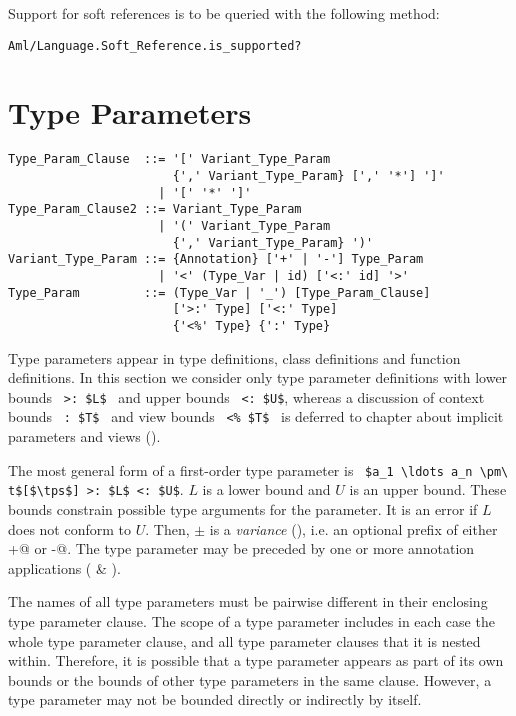 Support for soft references is to be queried with the following method:
\begin{lstlisting}
Aml/Language.Soft_Reference.is_supported?
\end{lstlisting}





\section{Type Parameters}

\grammar\begin{lstlisting}
Type_Param_Clause  ::= '[' Variant_Type_Param 
                       {',' Variant_Type_Param} [',' '*'] ']'
                     | '[' '*' ']'
Type_Param_Clause2 ::= Variant_Type_Param
                     | '(' Variant_Type_Param 
                       {',' Variant_Type_Param} ')'
Variant_Type_Param ::= {Annotation} ['+' | '-'] Type_Param
                     | '<' (Type_Var | id) ['<:' id] '>'
Type_Param         ::= (Type_Var | '_') [Type_Param_Clause]
                       ['>:' Type] ['<:' Type]
                       {'<%' Type} {':' Type}
\end{lstlisting}

Type parameters appear in type definitions, class definitions and function definitions. In this section we consider only type parameter definitions with lower bounds ~\lstinline!>: $L$!~ and upper bounds ~\lstinline!<: $U$!, whereas a discussion of context bounds ~\lstinline!: $T$!~ and view bounds ~\lstinline!<% $T$!~ is deferred to chapter about implicit parameters and views ().

The most general form of a first-order type parameter is ~\lstinline!$a_1 \ldots a_n \pm\ t$[$\tps$] >: $L$ <: $U$!. $L$ is a lower bound and $U$ is an upper bound. These bounds constrain possible type arguments for the parameter. It is an error if $L$ does not conform to $U$. Then, $\pm$ is a {\em variance} (), i.e. an optional prefix of either \lstinline@+@ or \lstinline@-@. The type parameter may be preceded by one or more annotation applications ( \& ).

The names of all type parameters must be pairwise different in their enclosing type parameter clause. The scope of a type parameter includes in each case the whole type parameter clause, and all type parameter clauses that it is nested within. Therefore, it is possible that a type parameter appears as part of its own bounds or the bounds of other type parameters in the same clause. However, a type parameter may not be bounded directly or indirectly by itself. 

